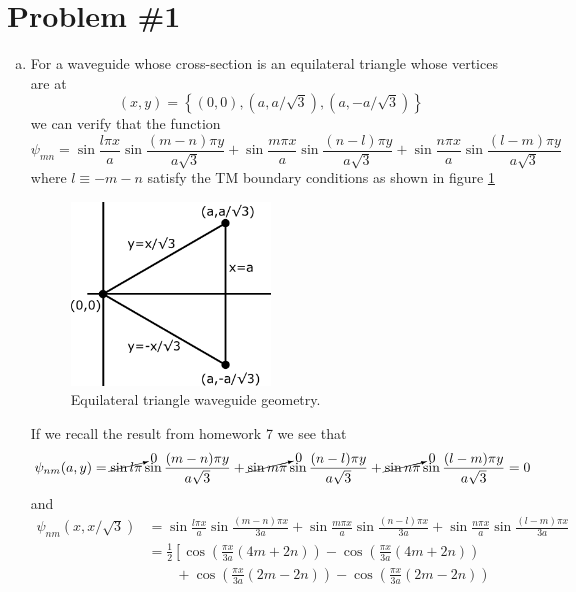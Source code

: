 \documentclass[11pt]{article}
\numberwithin{equation}{section}
\begin{document}


\section{Problem \#1}
\begin{enumerate}[(a)]
    \item
    For a waveguide whose cross-section is an equilateral triangle whose vertices are at
    $$(x,y) = \left\{(0,0),(a,a/\sqrt{3}),(a,-a/\sqrt{3})\right\}$$
    we can verify that the function
    $$\psi_{mn} = \sin\frac{l\pi{x}}{a}\sin\frac{(m-n)\pi{y}}{a\sqrt{3}} + \sin\frac{m\pi{x}}{a}\sin\frac{(n-l)\pi{y}}{a\sqrt{3}} + \sin\frac{n\pi{x}}{a}\sin\frac{(l-m)\pi{y}}{a\sqrt{3}}$$
    where $l\equiv-m-n$ satisfy the TM boundary conditions as shown in figure \ref{Triangle}
    \begin{figure}
        \centering
        \includegraphics[width=0.5\textwidth]{Triangle.png}
        \caption{Equilateral triangle waveguide geometry.}
        \label{Triangle}
    \end{figure}
    If we recall the result from homework 7 we see that 
    $$\psi_{nm}(a,y) = \cancelto{0}{\sin{l\pi}}\sin\frac{(m-n)\pi{y}}{a\sqrt{3}}
        + \cancelto{0}{\sin{m\pi}}\sin\frac{(n-l)\pi{y}}{a\sqrt{3}}
        + \cancelto{0}{\sin{n\pi}}\sin\frac{(l-m)\pi{y}}{a\sqrt{3}} = 0$$
     and
    \begin{align*}
        \psi_{nm}(x,x/\sqrt{3}) &= \sin\frac{l\pi{x}}{a}\sin\frac{(m-n)\pi{x}}{3a}
            + \sin\frac{m\pi{x}}{a}\sin\frac{(n-l)\pi{x}}{3a}
            + \sin\frac{n\pi{x}}{a}\sin\frac{(l-m)\pi{x}}{3a}\\
        &= \frac{1}{2}\left[\cos\left(\frac{\pi{x}}{3a}(4m+2n)\right) - \cos\left(\frac{\pi{x}}{3a}(4m+2n)\right)\right.\\
        &\qquad+\cos\left(\frac{\pi{x}}{3a}(2m-2n)\right) - \cos\left(\frac{\pi{x}}{3a}(2m-2n)\right)\\

\end{align*}
\end{enumerate}
\end{document}
